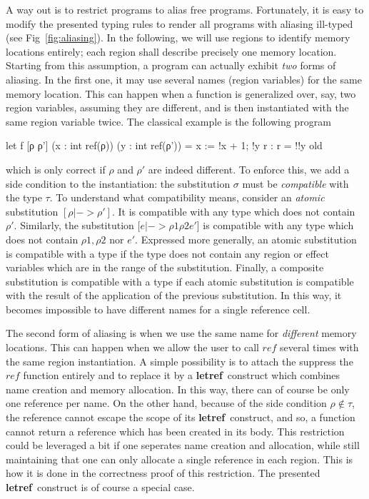 \documentclass[a4paper]{llncs}
\newcommand{\letml}{{\bf let}}
\newcommand{\refml}{{\bf ref}}
\begin{document}
A way out is to restrict programs to alias free programs. Fortunately, it is
easy to modify the presented typing rules to render all programs with aliasing
ill-typed (see Fig~\ref{fig:aliasing}). In the following, we will use regions
to identify memory locations entirely; each region shall describe precisely
one memory location. Starting from this assumption, a program can actually
exhibit {\em two} forms of aliasing. In the first one, it may use several
names (region variables) for the same memory location. This can happen when a
function is generalized over, say, two region variables, assuming they are
different, and is then instantiated with the same region variable twice. The
classical example is the following program
\begin{who}
  let f [ρ ρ'] (x : int ref(ρ)) (y : int ref(ρ')) =
  { }
  x := !x + 1;
  !y
  { r : r = !!y old }
\end{who}

which is only correct if $ ρ $ and $ ρ' $ are indeed different. To enforce
this, we add a side condition to the instantiation: the substitution $σ$ must
be {\em compatible} with the type $τ$. To understand what compatibility means,
consider an {\em atomic} substitution $[ρ|->ρ']$. It is compatible with any
type which does not contain $ρ'$. Similarly, the substitution $[e|-> ρ1  ρ2
e'$] is compatible with any type which does not contain $ ρ1 , ρ2 $ nor $e'$.
Expressed more generally, an atomic substitution is compatible with a type if
the type does not contain any region or effect variables which are in the
range of the substitution. Finally, a composite substitution is compatible
with a type if each atomic substitution is compatible with the result of the
application of the previous substitution. In this way, it becomes impossible
to have different names for a single reference cell.

The second form of aliasing is when we use the same name for {\em different}
memory locations. This can happen when we allow the user to call $ref$ several
times with the same region instantiation. A simple possibility is to attach
the suppress the $ref$ function entirely and to replace it by a \letml\refml\ 
construct which combines name creation and memory allocation. In this way,
there can of course be only one reference per name. On the other hand, because
of the side condition $ρ\notin τ$, the reference cannot escape the scope of
its \letml\refml\ construct, and so, a function cannot return a reference
which has been created in its body. This restriction could be leveraged a bit if
one seperates name creation and allocation, while still maintaining that one
can only allocate a single reference in each region. This is how it is done in
the correctness proof of this restriction. The presented \letml\refml\
construct is of course a special case.
\end{document}
